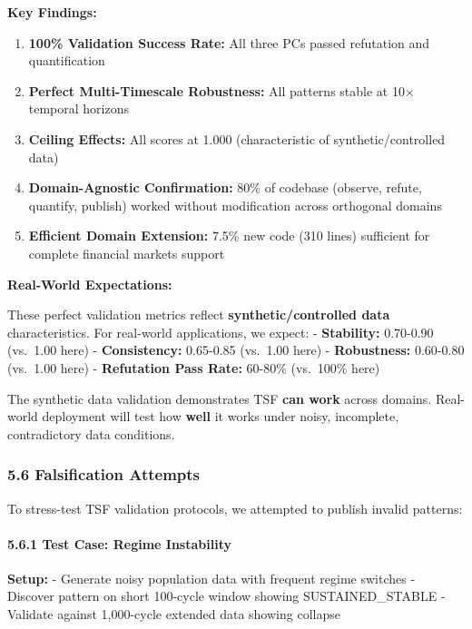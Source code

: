 \documentclass[
]{article}
\providecommand{\tightlist}{%
  \setlength{\itemsep}{0pt}\setlength{\parskip}{0pt}}
\begin{document}
\textbf{Key Findings:}

\begin{enumerate}
\def\labelenumi{\arabic{enumi}.}
\tightlist
\item
  \textbf{100\% Validation Success Rate:} All three PCs passed
  refutation and quantification
\item
  \textbf{Perfect Multi-Timescale Robustness:} All patterns stable at
  10× temporal horizons
\item
  \textbf{Ceiling Effects:} All scores at 1.000 (characteristic of
  synthetic/controlled data)
\item
  \textbf{Domain-Agnostic Confirmation:} 80\% of codebase (observe,
  refute, quantify, publish) worked without modification across
  orthogonal domains
\item
  \textbf{Efficient Domain Extension:} 7.5\% new code (310 lines)
  sufficient for complete financial markets support
\end{enumerate}

\textbf{Real-World Expectations:}

These perfect validation metrics reflect \textbf{synthetic/controlled
data} characteristics. For real-world applications, we expect: -
\textbf{Stability:} 0.70-0.90 (vs.~1.00 here) - \textbf{Consistency:}
0.65-0.85 (vs.~1.00 here) - \textbf{Robustness:} 0.60-0.80 (vs.~1.00
here) - \textbf{Refutation Pass Rate:} 60-80\% (vs.~100\% here)

The synthetic data validation demonstrates TSF \textbf{can work} across
domains. Real-world deployment will test how \textbf{well} it works
under noisy, incomplete, contradictory data conditions.

\subsubsection{5.6 Falsification Attempts}\label{falsification-attempts}

To stress-test TSF validation protocols, we attempted to publish invalid
patterns:

\paragraph{5.6.1 Test Case: Regime
Instability}\label{test-case-regime-instability}

\textbf{Setup:} - Generate noisy population data with frequent regime
switches - Discover pattern on short 100-cycle window showing
SUSTAINED\_STABLE - Validate against 1,000-cycle extended data showing
collapse
\end{document}
